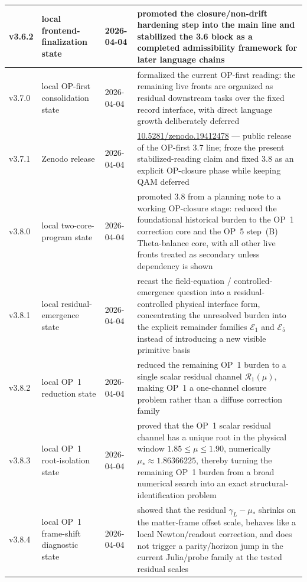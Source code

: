 {\begin{longtable}{|p{}|p{}|p{}|p{}|}
\hline
v3.6.2 & local frontend-finalization state & 2026-04-04 & promoted the closure/non-drift hardening step into the main line and stabilized the 3.6 block as a completed admissibility framework for later language chains \\
\hline
v3.7.0 & local OP-first consolidation state & 2026-04-04 & formalized the current OP-first reading: the remaining live fronts are organized as residual downstream tasks over the fixed record interface, with direct language growth deliberately deferred \\
\hline
v3.7.1 & Zenodo release & 2026-04-04 & \href{https://doi.org/10.5281/zenodo.19412478}{10.5281/zenodo.19412478} --- public release of the OP-first 3.7 line; froze the present stabilized-reading claim and fixed 3.8 as an explicit OP-closure phase while keeping QAM deferred \\
\hline
v3.8.0 & local two-core-program state & 2026-04-04 & promoted 3.8 from a planning note to a working OP-closure stage: reduced the foundational historical burden to the OP~1 correction core and the OP~5 step~(B) Theta-balance core, with all other live fronts treated as secondary unless dependency is shown \\
\hline
v3.8.1 & local residual-emergence state & 2026-04-04 & recast the field-equation / controlled-emergence question into a residual-controlled physical interface form, concentrating the unresolved burden into the explicit remainder families \(\mathcal E_1\) and \(\mathcal E_5\) instead of introducing a new visible primitive basis \\
\hline
v3.8.2 & local OP~1 reduction state & 2026-04-04 & reduced the remaining OP~1 burden to a single scalar residual channel \(\mathcal R_1(\mu)\), making OP~1 a one-channel closure problem rather than a diffuse correction family \\
\hline
v3.8.3 & local OP~1 root-isolation state & 2026-04-04 & proved that the OP~1 scalar residual channel has a unique root in the physical window \(1.85\le \mu\le 1.90\), numerically \(\mu_\ast\approx 1.86366225\), thereby turning the remaining OP~1 burden from a broad numerical search into an exact structural-identification problem \\
v3.8.4 & local OP~1 frame-shift diagnostic state & 2026-04-04 & showed that the residual \(\gamma_L-\mu_\ast\) shrinks on the matter-frame offset scale, behaves like a local Newton/readout correction, and does not trigger a parity/horizon jump in the current Julia/probe family at the tested residual scales \\

\end{longtable}}
